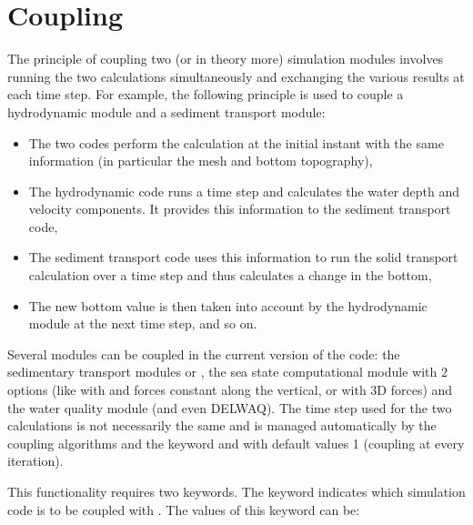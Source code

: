\section{Coupling}
\label{sec:coupling}

The principle of coupling two (or in theory more) simulation modules involves
running the two calculations simultaneously and exchanging the various results
at each time step. For example, the following principle is used to couple a
hydrodynamic module and a sediment transport module:

\begin{itemize}
\item  The two codes perform the calculation at the initial instant with the
same information (in particular the mesh and bottom topography),

\item  The hydrodynamic code runs a time step and calculates the water depth
and velocity components. It provides this information to the sediment transport
code,

\item  The sediment transport code uses this information to run the solid
transport calculation over a time step and thus calculates a change in the
bottom,

\item  The new bottom value is then taken into account by the hydrodynamic
module at the next time step, and so on.
\end{itemize}

Several modules can be coupled in the current version of the code:
the sedimentary transport modules \gaia or \sisyphe,
the sea state computational module \tomawac with 2 options (like with
 and forces constant along the vertical, or with 3D forces)
and the water quality module \waqtel (and even DELWAQ). The
time step used for the two calculations is not necessarily the same and is
managed automatically by the coupling algorithms and the keyword
 and 
with default values 1 (coupling at every iteration).

This functionality requires two keywords. The keyword 
indicates which simulation code is to be coupled with . The values of
this keyword can be:

